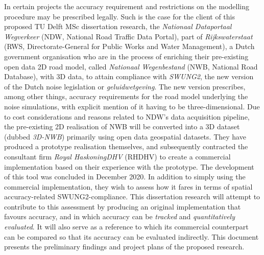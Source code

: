 In certain projects the accuracy requirement and restrictions on the modelling procedure may be prescribed legally. Such is the case for the client of this proposed TU Delft MSc dissertation research, the \textit{Nationaal Dataportaal Wegverkeer} (NDW, National Road Traffic Data Portal), part of \textit{Rijkswaterstaat} (RWS, Directorate-General for Public Works and Water Management), a Dutch government organisation who are in the process of enriching their pre-existing open data 2D road model, called \textit{Nationaal Wegenbestand} (NWB, National Road Database), with 3D data, to attain compliance with \textit{SWUNG2}, the new version of the Dutch noise legislation or \textit{geluidwetgeving}. The new version prescribes, among other things, accuracy requirements for the road model underlying the noise simulations, with explicit mention of it having to be three-dimensional. Due to cost considerations and reasons related to NDW’s data acquisition pipeline, the pre-existing 2D realisation of NWB will be converted into a 3D dataset (dubbed \textit{3D-NWB}) primarily using open data geospatial datasets. They have produced a prototype realisation themselves, and subsequently contracted the consultant firm \textit{Royal HaskoningDHV} (RHDHV) to create a commercial implementation based on their experience with the prototype. The development of this tool was concluded in December 2020. In addition to simply using the commercial implementation, they wish to assess how it fares in terms of spatial accuracy-related SWUNG2-compliance. This dissertation research will attempt to contribute to this assessment by producing an original implementation that favours accuracy, and in which accuracy can be \textit{tracked} and \textit{quantitatively evaluated}. It will also serve as a reference to which its commercial counterpart can be compared so that its accuracy can be evaluated indirectly. This document presents the preliminary findings and project plans of the proposed research.

